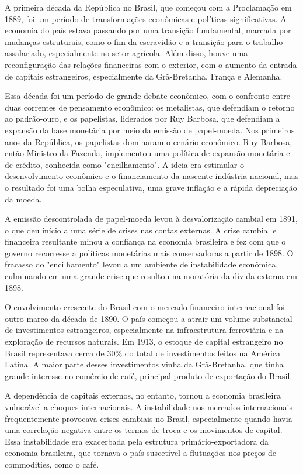 \documentclass[a4paper,12pt]{article}[abntex2]
\begin{document}
A primeira década da República no Brasil, que começou com a Proclamação em 1889, foi um período de transformações econômicas e políticas significativas. A economia do país estava passando por uma transição fundamental, marcada por mudanças estruturais, como o fim da escravidão e a transição para o trabalho assalariado, especialmente no setor agrícola. Além disso, houve uma reconfiguração das relações financeiras com o exterior, com o aumento da entrada de capitais estrangeiros, especialmente da Grã-Bretanha, França e Alemanha.

Essa década foi um período de grande debate econômico, com o confronto entre duas correntes de pensamento econômico: os metalistas, que defendiam o retorno ao padrão-ouro, e os papelistas, liderados por Ruy Barbosa, que defendiam a expansão da base monetária por meio da emissão de papel-moeda. Nos primeiros anos da República, os papelistas dominaram o cenário econômico. Ruy Barbosa, então Ministro da Fazenda, implementou uma política de expansão monetária e de crédito, conhecida como "encilhamento". A ideia era estimular o desenvolvimento econômico e o financiamento da nascente indústria nacional, mas o resultado foi uma bolha especulativa, uma grave inflação e a rápida depreciação da moeda.

A emissão descontrolada de papel-moeda levou à desvalorização cambial em 1891, o que deu início a uma série de crises nas contas externas. A crise cambial e financeira resultante minou a confiança na economia brasileira e fez com que o governo recorresse a políticas monetárias mais conservadoras a partir de 1898. O fracasso do "encilhamento" levou a um ambiente de instabilidade econômica, culminando em uma grande crise que resultou na moratória da dívida externa em 1898. 

O envolvimento crescente do Brasil com o mercado financeiro internacional foi outro marco da década de 1890. O país começou a atrair um volume substancial de investimentos estrangeiros, especialmente na infraestrutura ferroviária e na exploração de recursos naturais. Em 1913, o estoque de capital estrangeiro no Brasil representava cerca de 30\% do total de investimentos feitos na América Latina. A maior parte desses investimentos vinha da Grã-Bretanha, que tinha grande interesse no comércio de café, principal produto de exportação do Brasil.

A dependência de capitais externos, no entanto, tornou a economia brasileira vulnerável a choques internacionais. A instabilidade nos mercados internacionais frequentemente provocava crises cambiais no Brasil, especialmente quando havia uma correlação negativa entre os termos de troca e os movimentos de capital. Essa instabilidade era exacerbada pela estrutura primário-exportadora da economia brasileira, que tornava o país suscetível a flutuações nos preços de commodities, como o café.
\end{document}
